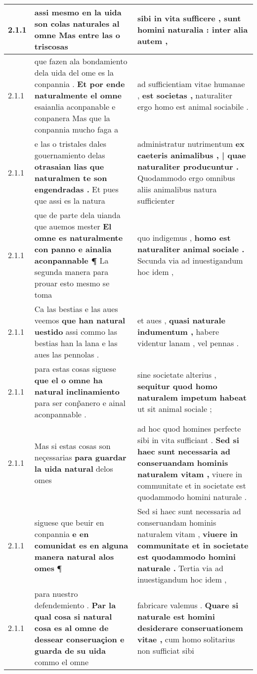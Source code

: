 \begin{tabular}{|p{1cm}|p{6.5cm}|p{6.5cm}|}
2.1.1 & assi mesmo en la uida \textbf{ son colas naturales al omne } Mas entre las o triscosas & sibi in vita sufficere , \textbf{ sunt homini naturalia : } inter alia autem , \\\hline
2.1.1 & que fazen ala bondamiento dela uida del ome es la conpannia . \textbf{ Et por ende naturalmente el omne } esaianlia aconpanable e conpanera Mas que la conpannia mucho faga a & ad sufficientiam vitae humanae , \textbf{ est societas , } naturaliter ergo homo est animal sociabile . \\\hline
2.1.1 & e las o tristales dales gouernamiento delas \textbf{ otrasaian lias que naturalmen te son engendradas . } Et pues que assi es la natura & administratur nutrimentum \textbf{ ex caeteris animalibus , | quae naturaliter producuntur . } Quodammodo ergo omnibus aliis animalibus natura sufficienter \\\hline
2.1.1 & que de parte dela uianda que auemos mester \textbf{ El omne es naturalmente con panno e ainalia aconpannable ¶ } La segunda manera para prouar esto mesmo se toma & quo indigemus , \textbf{ homo est naturaliter animal sociale . } Secunda via ad inuestigandum hoc idem , \\\hline
2.1.1 & Ca las bestias e las aues veemos \textbf{ que han natural uestido } assi commo las bestias han la lana e las aues las pennolas . & et aues , \textbf{ quasi naturale indumentum , } habere videntur lanam , vel pennas . \\\hline
2.1.1 & para estas cosas siguese \textbf{ que el o omne ha natural inclinamiento } para ser conp̃anero e ainal aconpannable . & sine societate alterius , \textbf{ sequitur quod homo naturalem impetum habeat } ut sit animal sociale ; \\\hline
2.1.1 & Mas si estas cosas son neçessarias \textbf{ para guardar la uida natural } delos omes & ad hoc quod homines perfecte sibi in vita sufficiant . \textbf{ Sed si haec sunt necessaria ad conseruandam hominis naturalem vitam , } viuere in communitate et in societate est quodammodo homini naturale . \\\hline
2.1.1 & siguese que beuir en conpannia \textbf{ e en comunidat es en alguna manera natural alos omes } ¶ & Sed si haec sunt necessaria ad conseruandam hominis naturalem vitam , \textbf{ viuere in communitate et in societate est quodammodo homini naturale . } Tertia via ad inuestigandum hoc idem , \\\hline
2.1.1 & para nuestro defendemiento . \textbf{ Par la qual cosa si natural cosa es al omne de dessear conseruaçion e guarda de su uida } commo el omne & fabricare valemus . \textbf{ Quare si naturale est homini desiderare conseruationem vitae , } cum homo solitarius non sufficiat sibi \\\hline

\end{tabular}
